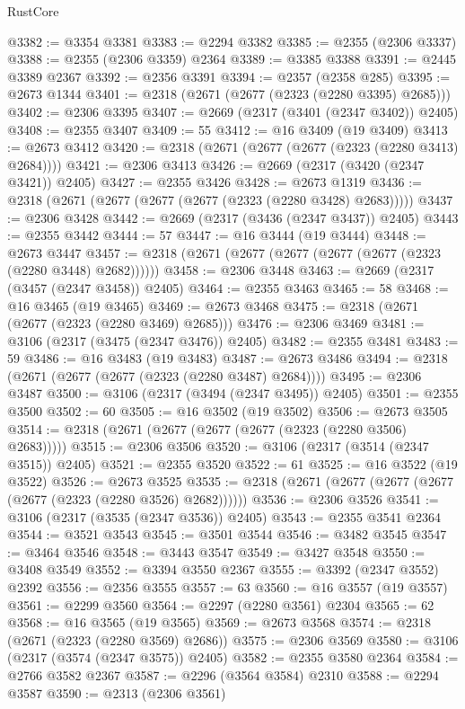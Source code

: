 \begin{lexlean}{RustCore}
\begin{coremodule}
@3382 := @3354 @3381
@3383 := @2294 @3382
@3385 := @2355 (@2306 @3337)
@3388 := @2355 (@2306 @3359) @2364
@3389 := @3385 @3388
@3391 := @2445 @3389 @2367
@3392 := @2356 @3391
@3394 := @2357 (@2358 @285)
@3395 := @2673 @1344
@3401 := @2318 (@2671 (@2677 (@2323 (@2280 @3395) @2685)))
@3402 := @2306 @3395
@3407 := @2669 (@2317 (@3401 (@2347 @3402)) @2405)
@3408 := @2355 @3407
@3409 := 55
@3412 := @16 @3409 (@19 @3409)
@3413 := @2673 @3412
@3420 := @2318 (@2671 (@2677 (@2677 (@2323 (@2280 @3413) @2684))))
@3421 := @2306 @3413
@3426 := @2669 (@2317 (@3420 (@2347 @3421)) @2405)
@3427 := @2355 @3426
@3428 := @2673 @1319
@3436 := @2318 (@2671 (@2677 (@2677 (@2677 (@2323 (@2280 @3428) @2683)))))
@3437 := @2306 @3428
@3442 := @2669 (@2317 (@3436 (@2347 @3437)) @2405)
@3443 := @2355 @3442
@3444 := 57
@3447 := @16 @3444 (@19 @3444)
@3448 := @2673 @3447
@3457 := @2318 (@2671 (@2677 (@2677 (@2677 (@2677 (@2323 (@2280 @3448) @2682))))))
@3458 := @2306 @3448
@3463 := @2669 (@2317 (@3457 (@2347 @3458)) @2405)
@3464 := @2355 @3463
@3465 := 58
@3468 := @16 @3465 (@19 @3465)
@3469 := @2673 @3468
@3475 := @2318 (@2671 (@2677 (@2323 (@2280 @3469) @2685)))
@3476 := @2306 @3469
@3481 := @3106 (@2317 (@3475 (@2347 @3476)) @2405)
@3482 := @2355 @3481
@3483 := 59
@3486 := @16 @3483 (@19 @3483)
@3487 := @2673 @3486
@3494 := @2318 (@2671 (@2677 (@2677 (@2323 (@2280 @3487) @2684))))
@3495 := @2306 @3487
@3500 := @3106 (@2317 (@3494 (@2347 @3495)) @2405)
@3501 := @2355 @3500
@3502 := 60
@3505 := @16 @3502 (@19 @3502)
@3506 := @2673 @3505
@3514 := @2318 (@2671 (@2677 (@2677 (@2677 (@2323 (@2280 @3506) @2683)))))
@3515 := @2306 @3506
@3520 := @3106 (@2317 (@3514 (@2347 @3515)) @2405)
@3521 := @2355 @3520
@3522 := 61
@3525 := @16 @3522 (@19 @3522)
@3526 := @2673 @3525
@3535 := @2318 (@2671 (@2677 (@2677 (@2677 (@2677 (@2323 (@2280 @3526) @2682))))))
@3536 := @2306 @3526
@3541 := @3106 (@2317 (@3535 (@2347 @3536)) @2405)
@3543 := @2355 @3541 @2364
@3544 := @3521 @3543
@3545 := @3501 @3544
@3546 := @3482 @3545
@3547 := @3464 @3546
@3548 := @3443 @3547
@3549 := @3427 @3548
@3550 := @3408 @3549
@3552 := @3394 @3550 @2367
@3555 := @3392 (@2347 @3552) @2392
@3556 := @2356 @3555
@3557 := 63
@3560 := @16 @3557 (@19 @3557)
@3561 := @2299 @3560
@3564 := @2297 (@2280 @3561) @2304
@3565 := 62
@3568 := @16 @3565 (@19 @3565)
@3569 := @2673 @3568
@3574 := @2318 (@2671 (@2323 (@2280 @3569) @2686))
@3575 := @2306 @3569
@3580 := @3106 (@2317 (@3574 (@2347 @3575)) @2405)
@3582 := @2355 @3580 @2364
@3584 := @2766 @3582 @2367
@3587 := @2296 (@3564 @3584) @2310
@3588 := @2294 @3587
@3590 := @2313 (@2306 @3561)

\end{coremodule}
\end{lexlean}
